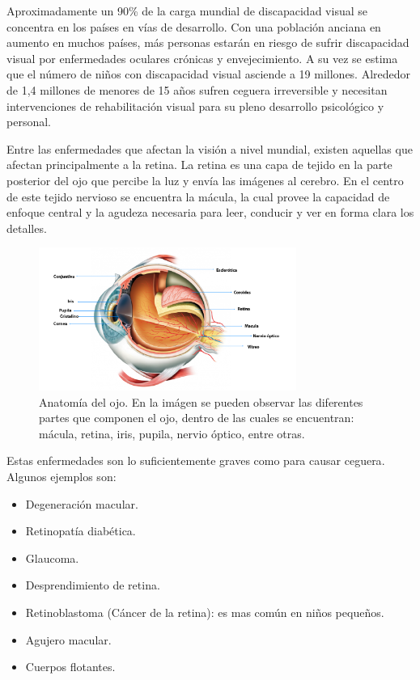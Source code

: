 Aproximadamente un 90\% de la carga mundial de discapacidad visual se concentra en los pa\'ises en v\'ias de desarrollo. Con una poblaci\'on anciana en aumento en muchos pa\'ises, m\'as personas estar\'an en riesgo de sufrir discapacidad visual por enfermedades oculares cr\'onicas y envejecimiento.
A su vez se estima que el n\'umero de niños con discapacidad visual asciende a 19 millones. Alrededor de 1,4 millones de menores de 15 años sufren ceguera irreversible y necesitan intervenciones de rehabilitaci\'on visual para su pleno desarrollo psicol\'ogico y personal.

Entre las enfermedades que afectan la visi\'on a nivel mundial, existen aquellas que afectan principalmente a la retina. La retina es una capa de tejido en la parte posterior del ojo que percibe la luz y env\'ia las im\'agenes al cerebro. En el centro de este tejido nervioso se encuentra la m\'acula, la cual provee la capacidad de enfoque central y la agudeza necesaria para leer, conducir y ver en forma clara los detalles.

\begin{figure}[H]
	{
	\centering
	\includegraphics[width=0.75\textwidth]{Figures/anatomia-del-ojo}
	\caption[Anatom\'ia del ojo]{Anatom\'ia del ojo. En la im\'agen se pueden observar las diferentes partes que componen el ojo, dentro de las cuales se encuentran: m\'acula, retina, iris, pupila, nervio \'optico, entre otras.}
	\label{fig:AnatomiaDeOjo}
	}
\end{figure}

Estas enfermedades son lo suficientemente graves como para causar ceguera\cite{nih:enfermedadesRetina}. Algunos ejemplos son:
\begin{itemize}
\item Degeneraci\'on macular.
\item Retinopat\'ia diab\'etica.
\item Glaucoma.
\item Desprendimiento de retina.
\item Retinoblastoma (C\'ancer de la retina): es mas com\'un en ni\~nos peque\~nos.
\cite{nih:retinoblastoma}
\item Agujero macular.
\item Cuerpos flotantes.
\end{itemize}

